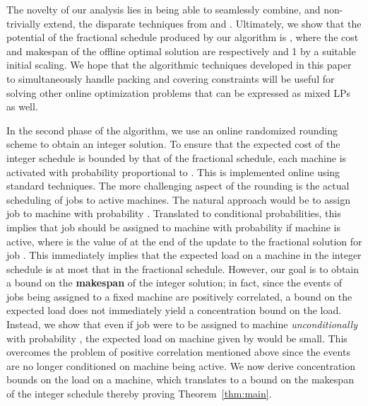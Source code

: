 \documentclass[11pt]{article}
\begin{document}
The novelty of our analysis lies in being able to seamlessly combine, and
non-trivially extend, the disparate 
techniques from \cite{AlonAABN09} and \cite{AspnesAFPW97}.
Ultimately, we show that the potential of the fractional schedule 
produced by our algorithm is , where the cost and makespan
of the offline optimal solution are respectively  and 1 by 
a suitable initial scaling. We hope that the algorithmic 
techniques developed in this paper to simultaneously handle packing and
covering constraints will be useful for solving other online optimization 
problems that can be expressed as mixed LPs as well. 

In the second phase of the algorithm, we use an online randomized rounding scheme 
to obtain an integer solution. To ensure that the expected cost of 
the integer schedule is bounded by that of the fractional schedule, each machine  
is activated with probability proportional to . This is implemented online using 
standard techniques. The more challenging aspect of the rounding is the actual 
scheduling of jobs to active machines. The natural approach would be to assign 
job  to machine  with probability . 
Translated to conditional probabilities, this implies
that job  should be assigned to machine  with probability 
if machine  is active, where  is the value of  at the end of the
update to the fractional solution for job . This immediately implies that the expected
load on a machine in the integer schedule is at most that in the fractional schedule. 
However, our goal is to obtain a bound
on the {\bf makespan} of the integer solution; in fact, since the events of 
jobs being assigned to a fixed machine are positively
correlated, a bound on the expected load does not immediately
yield a concentration bound on the load. Instead, we show that even if job  
were to be assigned to machine  {\em unconditionally} with probability ,
the expected load on machine  given by  would be small. 
This overcomes the problem of positive correlation mentioned above since the events are 
no longer conditioned on machine  being active. We now derive
concentration bounds on the load on a machine, which translates to a bound on the 
makespan of the integer schedule thereby proving Theorem~\ref{thm:main}.

\noindent
\end{document}
